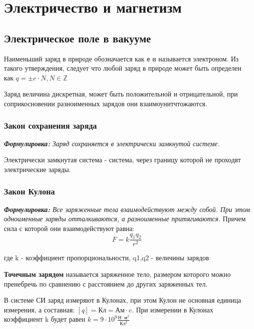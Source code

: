 \documentclass[../main.tex]{subfiles}
\begin{document}
\chapter{Электричество и магнетизм}

\section{Электрическое поле в вакууме}
Наименьший заряд в природе обозначается как \texttt{e} и называется электроном. Из такого утверждения, следует что любой заряд в природе может быть определен как  $ q = \pm e \cdot N, N \in \mathbb{Z}$

\vspace{5px}

Заряд величина дискретная, может быть положительной и отрицательной, при соприкосновении разноименных зарядов они взаимоунитчтожаются.
\subsection{Закон сохранения заряда}
\textit{\textbf{Формулировка:} Заряд сохраняется в электрически замкнутой системе.}

 Электрически замкнутая система - система, через границу которой не проходят электрические заряды.

\subsection{Закон Кулона}
\textit{\textbf{Формулировка:} Все заряженные тела взаимодействуют между собой. При этом одноименные заряды отталкиваются, а разноименные притягиваются.}
Причем сила с которой они взаимодействуют равна:
\[ F = k\frac{q_1 q_2}{r^2}\]
\begin{center}
    где k - коэффициент пропорциональности, q1,q2 - величины зарядов
\end{center}

 \textbf{Точечным зарядом} называется заряженное тело, размером которого можно пренебречь по сравнению с расстоянием до других заряженных тел.

\vspace{5px}

В системе СИ заряд измеряют в Кулонах, при этом Кулон не основная единица измерения, а составная: $[q] = \text{Кл} = \text{Ам} \cdot \text{c}$. 
При измерении в Кулонах коэффициент k будет равен $k = 9 \cdot 10^9 \frac{\text{Н} \cdot \text{м}^2}{\text{Кл}^2}$
\end{document}

